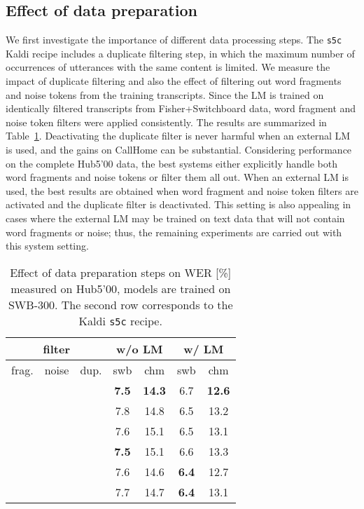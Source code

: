 \documentclass[a4paper]{article}
\begin{document}
\subsection{Effect of data preparation}
We first investigate the importance of different data processing steps.
The \texttt{s5c} Kaldi recipe includes a duplicate filtering step, in which the maximum number of occurrences of utterances with the same content is limited. We measure the impact of duplicate filtering and also the effect of filtering out word fragments and noise tokens from the training transcripts.
Since the LM is trained on identically filtered transcripts from Fisher+Switchboard data, word fragment and noise token filters were applied consistently.
The results are summarized in Table~\ref{tab:preparation}.
Deactivating the duplicate filter is never harmful when an external LM is used, and the gains on CallHome can be substantial. Considering performance on the complete Hub5'00 data, the best systems either explicitly handle both word fragments and noise tokens or filter them all out. When an external LM is used, the best results are obtained when word fragment and noise token filters are activated and the duplicate filter is deactivated. This setting is also appealing in cases where the external LM may be trained on text data that will not contain word fragments or noise; thus, the remaining experiments are carried out with this system setting.

\begin{table}
  \centering
  \caption{Effect of data preparation steps on WER [\%] measured on Hub5'00, models are trained on SWB-300. The second row corresponds to the Kaldi \texttt{s5c} recipe.}
  \vspace{-3mm}
  \begin{tabular}{|c|c|c|c|c|c|c|}
    \hline
  \multicolumn{3}{|c}{filter} 
               & \multicolumn{2}{|c|}{w/o LM} & \multicolumn{2}{|c|}{w/ LM}              \\
\hline
frag. &  noise & dup.       &  swb & chm  & swb & chm  \\
\hline
\hline
         &          &           & {\bf 7.5}  & {\bf 14.3} & 6.7        & {\bf 12.6} \\  
\hline         
         &          &   & 7.8         & 14.8        & 6.5        & 13.2   \\  
\hline         
         &  &           & 7.6         & 15.1        & 6.5        & 13.1   \\  
\hline         
         &  &   & {\bf 7.5}  & 15.1        & 6.6        & 13.3   \\  
\hline         
 &  &           & 7.6         & 14.6        & {\bf 6.4} & 12.7  \\  
\hline         
 &  &   & 7.7         & 14.7        & {\bf 6.4}        & 13.1   \\  
\hline
\end{tabular}                              
\label{tab:preparation}
\vspace{-3mm}
\end{table}
\end{document}
